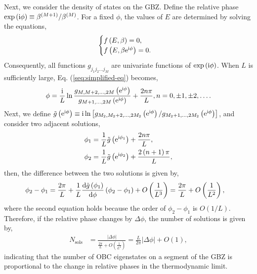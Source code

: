 \documentclass[pdflatex,sn-nature, iicol]{sn-jnl}%
\theoremstyle{thmstyleone}%
\theoremstyle{thmstyletwo}%
\theoremstyle{thmstylethree}%
\begin{document}
Next, we consider the density of states on the GBZ. Define the relative
phase $\exp\left(\mathrm{i}\phi\right)\equiv\beta^{(M+1)}/\beta^{(M)}$.
For a fixed $\phi$, the values of $E$ are determined by solving
the equations, 
\begin{equation}
\begin{cases}
f\left(E,\beta\right)=0,\\
f\left(E,\beta\mathrm{e}^{\mathrm{i}\phi}\right)=0.
\end{cases}
\end{equation}
Consequently, all functions $g_{j_{1}j_{2}\dots j_{M}}$ are univariate
functions of $\exp\left(\mathrm{i}\phi\right)$. When $L$ is sufficiently
large, Eq. (\ref{seq:simplified-eq}) becomes, 
\begin{equation}
\phi=\frac{\mathrm{i}}{L}\ln\frac{g_{M,M+2,\dots,2M}\left(\mathrm{e}^{\mathrm{i}\phi}\right)}{g_{M+1,\dots,2M}\left(\mathrm{e}^{\mathrm{i}\phi}\right)}+\frac{2n\pi}{L},n=0,\pm1,\pm2,\dots.\label{seq:phi-eq}
\end{equation}
Next, we define $\tilde{g}\left(\mathrm{e}^{\mathrm{i}\phi}\right)\equiv\mathrm{i}\ln\left[g_{M_{2},M_{2}+2,\dots,2M_{2}}\left(\mathrm{e}^{\mathrm{i}\phi}\right)/g_{M_{2}+1,\dots,2M_{2}}\left(\mathrm{e}^{\mathrm{i}\phi}\right)\right]$,
and consider two adjacent solutions, 
\begin{align}
\phi_{1} & =\frac{1}{L}\tilde{g}\left(\mathrm{e}^{\mathrm{i}\phi_{1}}\right)+\frac{2n\pi}{L},\\
\phi_{2} & =\frac{1}{L}\tilde{g}\left(\mathrm{e}^{\mathrm{i}\phi_{2}}\right)+\frac{2\left(n+1\right)\pi}{L},
\end{align}
then, the difference between the two solutions is given by, 
\begin{align}
\phi_{2}-\phi_{1} & =\frac{2\pi}{L}+\frac{1}{L}\frac{\mathrm{d}\tilde{g}\left(\phi_{1}\right)}{\mathrm{d}\phi}\left(\phi_{2}-\phi_{1}\right)+O\left(\frac{1}{L^{3}}\right)=\frac{2\pi}{L}+O\left(\frac{1}{L^{2}}\right),
\end{align}
where the second equation holds because the order of $\phi_{2}-\phi_{1}$
is $O(1/L)$. Therefore, if the relative phase changes by $\Delta\phi$,
the number of solutions is given by, 
\begin{align}
N_{\text{sols}} & =\frac{\left|\Delta\phi\right|}{\frac{2\pi}{L}+O\left(\frac{1}{L^{2}}\right)}=\frac{L}{2\pi}\left|\Delta\phi\right|+O\left(1\right),\label{eq:sols-and-argument}
\end{align}
indicating that the number of OBC eigenstates on a segment of the
GBZ is proportional to the change in relative phases in the thermodynamic
limit.
\end{document}
